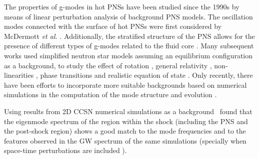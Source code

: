  The {properties of} g-modes in hot {PNSs} have been studied since the 1990s
 {by means of linear perturbation analysis of background PNS models}. The oscillation modes connected with the surface of hot PNSs were first considered by McDermott {\it et al.} \citep{McDermott:1983}. Additionally, the stratified structure of the PNS allows for the presence of different types of g-modes related to the fluid core \citep{Reisenegger:1992}. Many subsequent works used simplified neutron star models assuming an equilibrium configuration {as a background}, to study the effect of rotation \citep{Ferrari:2004}, general relativity \citep{Passamonti:2005}, non-linearities \citep{Dimmelmeier:2006}, phase transitions \citep{Kruger:2015} and realistic equation of state \citep{Camelio:2017}. {Only recently, there have been efforts to incorporate more suitable backgrounds based on numerical simulations in the computation of the mode structure and evolution \citep{Sotani:2016,Torres:2018, Morozova:2018, Torres:2019a,Torres:2019b,Sotani:2019,WS:2019,Sotani:2020a, Sotani:2020b}}.
 
Using results from 2D CCSN numerical simulations as a background~\citep{Torres:2018, Torres:2019a} found that the eigenmode spectrum of the region within the shock (including the PNS and the post-shock region) 
shows a good match to the mode frequencies and to the features observed in the GW spectrum of the same simulations (specially when space-time perturbations are included \citep{Torres:2019a}).

